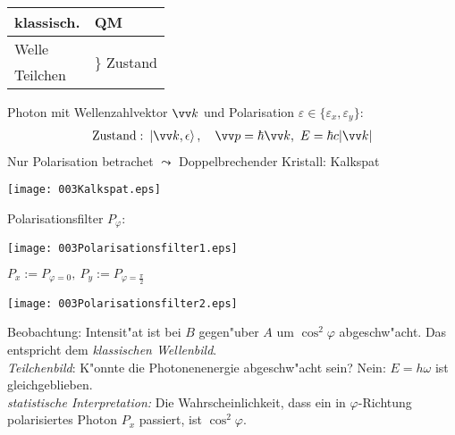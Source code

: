\documentclass[a4paper]{scrartcl}
\begin{document}
{
\begin{center}
\begin{tabular}{l  l}
klassisch. & QM \\
\hline
Welle & \multirow{2}{*}{ $\Big\}$ Zustand } \\
Teilchen
\end{tabular}
\end{center}
Photon mit Wellenzahlvektor $\vv k$ und Polarisation $\varepsilon \in \{ \varepsilon_x, \varepsilon_y \}$:
\begin{align}
\mathrm{Zustand:} \ \Ket{ \vv k, \epsilon}, \quad \vv p = \hbar \vv k, \ E= \hbar c \vert \vv k \vert
\end{align}
Nur Polarisation betrachet $\leadsto$ Doppelbrechender Kristall: Kalkspat

\begin{center}
\texttt{[image: 003Kalkspat.eps]}
\end{center}
Polarisationsfilter $P_\varphi$:
\begin{center}
\texttt{[image: 003Polarisationsfilter1.eps]}
\end{center}
$P_x := P_{\varphi = 0}, \ P_y := P_{\varphi = \frac\pi2}$
\begin{center}
\texttt{[image: 003Polarisationsfilter2.eps]}
\end{center}
Beobachtung: Intensit"at ist bei $B$ gegen"uber $A$ um $\cos^2 \varphi$ abgeschw"acht. Das entspricht dem \emph{klassischen Wellenbild}. \\
\emph{Teilchenbild}: K"onnte die Photonenenergie abgeschw"acht sein? Nein: $E = h \omega$ ist gleichgeblieben. \\
\emph{statistische Interpretation:} 
Die Wahrscheinlichkeit, dass ein in $\varphi$-Richtung polarisiertes Photon $P_x$ passiert, ist $\cos^2 \varphi$.

}
\end{document}
